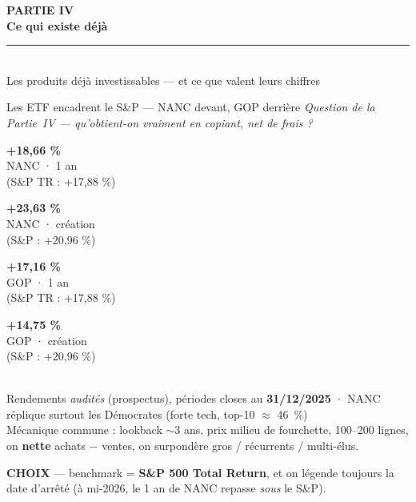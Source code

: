 \documentclass[11pt,aspectratio=169]{beamer}
\newcommand{\tuile}[3]{%
  \begin{minipage}[t]{0.23\textwidth}\centering
    \colorbox{#1}{\parbox[c][21mm][c]{\dimexpr\linewidth-8pt}{\centering
      {\color{white}\Large\textbf{#2}}\\[0.6mm]
      {\color{white}\footnotesize #3}}}
  \end{minipage}}
\newcommand{\choixbox}[1]{%
  \colorbox{alertred!8}{\parbox{\dimexpr\linewidth-8pt}{\scriptsize
    \textbf{\textcolor{alertred}{CHOIX}}\; --- #1}}}
\begin{document}
\begin{frame}[plain]
  \centering
  \vspace{12mm}
  {\color{helec!85}\large\textbf{PARTIE IV}}\\[3mm]
  {\color{black!88}\fontsize{30}{34}\selectfont\textbf{Ce qui existe déjà}}\\[3mm]
  {\color{helec!45}\rule{0.30\textwidth}{1.2pt}}\\[3mm]
  {\color{black!55}\large Les produits déjà investissables --- et ce que valent leurs chiffres}
\end{frame}

\begin{frame}{Les ETF encadrent le S\&P --- NANC devant, GOP derrière}
  \centering
  {\footnotesize\textit{Question de la Partie~IV --- qu'obtient-on vraiment en copiant, net de frais ?}}\\[3.5mm]
  \tuile{okgreen}{+18,66 \%}{NANC · 1 an\\(S\&P TR : +17,88 \%)}\hfill
  \tuile{helec}{+23,63 \%}{NANC · création\\(S\&P : +20,96 \%)}\hfill
  \tuile{warnorange}{+17,16 \%}{GOP · 1 an\\(S\&P TR : +17,88 \%)}\hfill
  \tuile{alertred}{+14,75 \%}{GOP · création\\(S\&P : +20,96 \%)}\\[2.5mm]
  {\scriptsize\color{black!60} Rendements \emph{audités} (prospectus), périodes closes au \textbf{31/12/2025} ·
   NANC réplique surtout les Démocrates (forte tech, top-10 $\approx$ 46~\%)}\\[2.5mm]
  {\footnotesize Mécanique commune : lookback $\sim$3 ans, prix milieu de fourchette, 100--200 lignes,
   on \textbf{nette} achats $-$ ventes, on surpondère gros / récurrents / multi-élus.}\\[2.5mm]
  \choixbox{benchmark = \textbf{S\&P 500 Total Return}, et on légende toujours la date d'arrêté
   (à mi-2026, le 1 an de NANC repasse \emph{sous} le S\&P).}
\end{frame}
\end{document}
